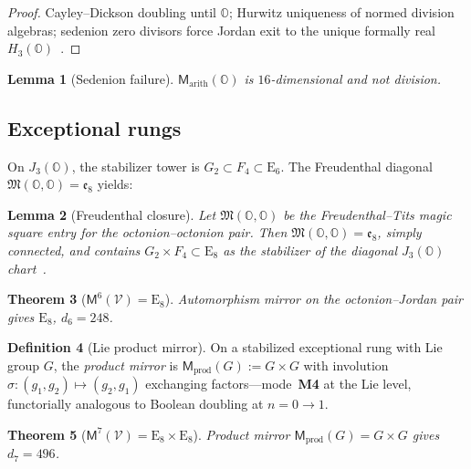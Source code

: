 \documentclass[aps,prd,onecolumn,amsmath,amssymb,nofootinbib,11pt]{revtex4-2}
\numberwithin{equation}{section}
\theoremstyle{plain}
\newtheorem{theorem}{Theorem}[section]
\newtheorem{lemma}[theorem]{Lemma}
\theoremstyle{definition}
\newtheorem{definition}[theorem]{Definition}
\theoremstyle{remark}
\newcommand{\Oct}{\mathbb{O}}
\newcommand{\jalg}{J_3(\mathbb{O})}
\newcommand{\E}[1]{\mathrm{E}_{#1}}
\newcommand{\Void}{\mathcal{V}}
\newcommand{\Mirror}{\mathsf{M}}
\begin{document}
\begin{proof}
Cayley--Dickson doubling until $\Oct$; Hurwitz uniqueness of normed division
algebras; sedenion zero divisors force Jordan exit to the unique formally real
$H_3(\Oct)$~\cite{Hurwitz1898,SpringerVeldkamp2000}.
\end{proof}

\begin{lemma}[Sedenion failure]\label{lem:sedenion}
$\Mirror_{\mathrm{arith}}(\Oct)$ is $16$-dimensional and not division.
\end{lemma}

\subsection{Exceptional rungs}
\label{sec:climb:exceptional}

On $\jalg$, the stabilizer tower is $G_2\subset F_4\subset\E{6}$. The
Freudenthal diagonal $\mathfrak{M}(\Oct,\Oct)=\mathfrak{e}_8$ yields:

\begin{lemma}[Freudenthal closure]\label{lem:freudenthal}
Let $\mathfrak{M}(\Oct,\Oct)$ be the Freudenthal--Tits magic square entry for
the octonion--octonion pair. Then $\mathfrak{M}(\Oct,\Oct)=\mathfrak{e}_8$,
simply connected, and contains $G_2\times F_4\subset\E{8}$ as the stabilizer of
the diagonal $\jalg$ chart~\cite{Freudenthal1954,Tits1966}.
\end{lemma}

\begin{theorem}[$\Mirror^6(\Void)=\E{8}$]\label{thm:e8}
Automorphism mirror on the octonion--Jordan pair gives $\E{8}$, $d_6=248$.
\end{theorem}

\begin{definition}[Lie product mirror]\label{def:prod-mirror}
On a stabilized exceptional rung with Lie group $G$, the \emph{product mirror}
is $\Mirror_{\mathrm{prod}}(G):=G\times G$ with involution
$\sigma:(g_1,g_2)\mapsto(g_2,g_1)$ exchanging factors---mode~\textbf{M4} at the
Lie level, functorially analogous to Boolean doubling at $n=0\to1$.
\end{definition}

\begin{theorem}[$\Mirror^7(\Void)=\E{8}\times\E{8}$]\label{thm:e8e8}
Product mirror $\Mirror_{\mathrm{prod}}(G)=G\times G$ gives $d_7=496$.
\end{theorem}
\end{document}
